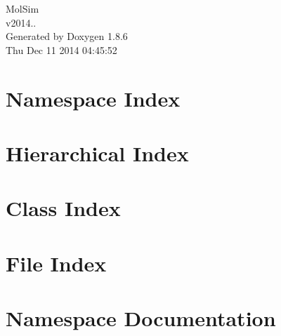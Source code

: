 \documentclass[twoside]{book}
\newcommand{\clearemptydoublepage}{%
  \newpage{\pagestyle{empty}\cleardoublepage}%
}
\begin{document}
\hypersetup{pageanchor=false}
\begin{titlepage}
\vspace*{7cm}
\begin{center}%
{\Large Mol\-Sim \\[1ex]\large v2014.. }\\
\vspace*{1cm}
{\large Generated by Doxygen 1.8.6}\\
\vspace*{0.5cm}
{\small Thu Dec 11 2014 04:45:52}\\
\end{center}
\end{titlepage}
\clearemptydoublepage
\tableofcontents
\clearemptydoublepage
{}
\hypersetup{pageanchor=true}

\chapter{Namespace Index}

\chapter{Hierarchical Index}

\chapter{Class Index}

\chapter{File Index}

\chapter{Namespace Documentation}





\end{document}
